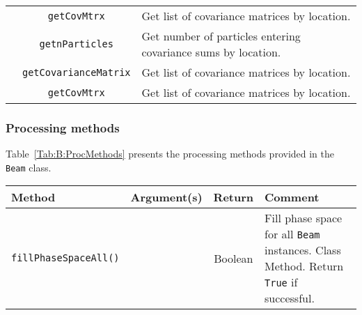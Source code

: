 \begin{sidewaystable}[h]
\begin{center}
\begin{tabular}{|c|c|p{9cm}|}
                                               & \texttt{getCovMtrx}                      & Get list of covariance matrices by location.     \\
                                               & \texttt{getnParticles}                   & Get number of particles entering covariance sums by location. \\
                                               & \texttt{getCovarianceMatrix}             & Get list of covariance matrices by location.     \\
                                               & \texttt{getCovMtrx}                      & Get list of covariance matrices by location.     \\
      \hline
    \end{tabular}
  \end{center}
\end{sidewaystable}

\subsubsection{Processing methods}
Table~\ref{Tab:B:ProcMethods} presents the processing methods provided
in the \texttt{Beam} class.
\begin{sidewaystable}[h]
  \caption{
    Processing methods provided by the \texttt{Beam}
    class. 
  }
  \label{Tab:B:ProcMethods}
  \begin{center}
    \begin{tabular}{|l|c|c|p{10cm}|}
      \hline
      \textbf{Method} & \textbf{Argument(s)} & \textbf{Return} & \textbf{Comment}                                            \\
      \hline
      \texttt{fillPhaseSpaceAll()} & & Boolean & Fill phase space for all \texttt{Beam} instances.  Class Method.
                                                 Return \texttt{True} if successful.                                         \\
      \hline
    \end{tabular}
  \end{center}
\end{sidewaystable}

